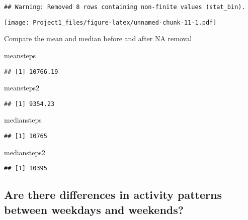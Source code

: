 \documentclass[
]{article}
\newenvironment{Shaded}{\begin{snugshade}}{\end{snugshade}}
\newcommand{\NormalTok}[1]{#1}
\begin{document}
\begin{verbatim}
## Warning: Removed 8 rows containing non-finite values (stat_bin).
\end{verbatim}

\texttt{[image: Project1\_files/figure-latex/unnamed-chunk-11-1.pdf]}

Compare the mean and median before and after NA removal

\begin{Shaded}
\begin{Highlighting}[]
\NormalTok{meansteps}
\end{Highlighting}
\end{Shaded}

\begin{verbatim}
## [1] 10766.19
\end{verbatim}

\begin{Shaded}
\begin{Highlighting}[]
\NormalTok{meansteps2}
\end{Highlighting}
\end{Shaded}

\begin{verbatim}
## [1] 9354.23
\end{verbatim}

\begin{Shaded}
\begin{Highlighting}[]
\NormalTok{mediansteps}
\end{Highlighting}
\end{Shaded}

\begin{verbatim}
## [1] 10765
\end{verbatim}

\begin{Shaded}
\begin{Highlighting}[]
\NormalTok{mediansteps2}
\end{Highlighting}
\end{Shaded}

\begin{verbatim}
## [1] 10395
\end{verbatim}

\hypertarget{are-there-differences-in-activity-patterns-between-weekdays-and-weekends}{%
\subsection{Are there differences in activity patterns between weekdays
and
weekends?}\label{are-there-differences-in-activity-patterns-between-weekdays-and-weekends}}
\end{document}
